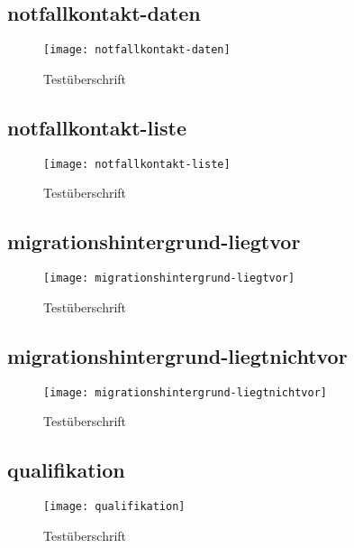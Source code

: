 \begin{landscape}
\subsection{notfallkontakt-daten}
\begin{figure}[H]
    \centering
    \caption{Testüberschrift}
    \begin{adjustbox}{width=0.6\linewidth, center}
        \texttt{[image: notfallkontakt-daten]}
    \end{adjustbox}
\end{figure}

\subsection{notfallkontakt-liste}
\begin{figure}[H]
    \centering
    \caption{Testüberschrift}
    \begin{adjustbox}{width=\linewidth, center}
        \texttt{[image: notfallkontakt-liste]}
    \end{adjustbox}
\end{figure}

\subsection{migrationshintergrund-liegtvor}
\begin{figure}[H]
    \centering
    \caption{Testüberschrift}
    \begin{adjustbox}{width=\linewidth, center}
        \texttt{[image: migrationshintergrund-liegtvor]}
    \end{adjustbox}
\end{figure}

\subsection{migrationshintergrund-liegtnichtvor}
\begin{figure}[H]
    \centering
    \caption{Testüberschrift}
    \begin{adjustbox}{width=\linewidth, center}
        \texttt{[image: migrationshintergrund-liegtnichtvor]}
    \end{adjustbox}
\end{figure}

\subsection{qualifikation}
\begin{figure}[H]
    \centering
    \caption{Testüberschrift}
    \begin{adjustbox}{width=\linewidth, center}
        \texttt{[image: qualifikation]}
    \end{adjustbox}
\end{figure}


\end{landscape}
